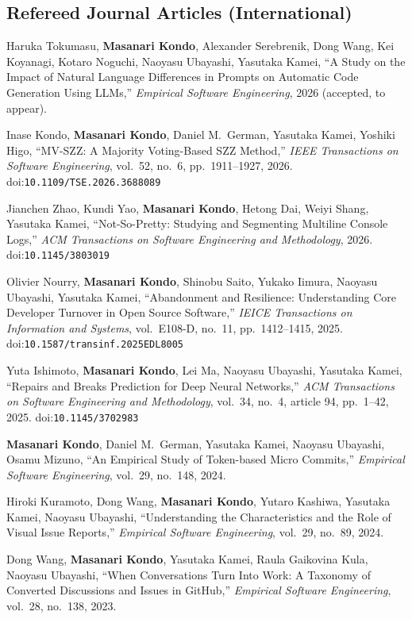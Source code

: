 \documentclass[10pt,a4paper]{article}
\newcommand{\me}{\textbf{Masanari Kondo}}
\begin{document}
\subsection{Refereed Journal Articles (International)}
\begin{publist}[label={[J\arabic*]}]
  \item Haruka Tokumasu, \me, Alexander Serebrenik, Dong Wang, Kei Koyanagi, Kotaro Noguchi, Naoyasu Ubayashi, Yasutaka Kamei, ``A Study on the Impact of Natural Language Differences in Prompts on Automatic Code Generation Using LLMs,'' \textit{Empirical Software Engineering}, 2026 (accepted, to appear).
  \item Inase Kondo, \me, Daniel M.\ German, Yasutaka Kamei, Yoshiki Higo, ``MV-SZZ: A Majority Voting-Based SZZ Method,'' \textit{IEEE Transactions on Software Engineering}, vol.\ 52, no.\ 6, pp.\ 1911--1927, 2026. doi:\nolinkurl{10.1109/TSE.2026.3688089}
  \item Jianchen Zhao, Kundi Yao, \me, Hetong Dai, Weiyi Shang, Yasutaka Kamei, ``Not-So-Pretty: Studying and Segmenting Multiline Console Logs,'' \textit{ACM Transactions on Software Engineering and Methodology}, 2026. doi:\nolinkurl{10.1145/3803019}
  \item Olivier Nourry, \me, Shinobu Saito, Yukako Iimura, Naoyasu Ubayashi, Yasutaka Kamei, ``Abandonment and Resilience: Understanding Core Developer Turnover in Open Source Software,'' \textit{IEICE Transactions on Information and Systems}, vol.\ E108-D, no.\ 11, pp.\ 1412--1415, 2025. doi:\nolinkurl{10.1587/transinf.2025EDL8005}
  \item Yuta Ishimoto, \me, Lei Ma, Naoyasu Ubayashi, Yasutaka Kamei, ``Repairs and Breaks Prediction for Deep Neural Networks,'' \textit{ACM Transactions on Software Engineering and Methodology}, vol.\ 34, no.\ 4, article 94, pp.\ 1--42, 2025. doi:\nolinkurl{10.1145/3702983}
  \item \me, Daniel M.\ German, Yasutaka Kamei, Naoyasu Ubayashi, Osamu Mizuno, ``An Empirical Study of Token-based Micro Commits,'' \textit{Empirical Software Engineering}, vol.\ 29, no.\ 148, 2024.
  \item Hiroki Kuramoto, Dong Wang, \me, Yutaro Kashiwa, Yasutaka Kamei, Naoyasu Ubayashi, ``Understanding the Characteristics and the Role of Visual Issue Reports,'' \textit{Empirical Software Engineering}, vol.\ 29, no.\ 89, 2024.
  \item Dong Wang, \me, Yasutaka Kamei, Raula Gaikovina Kula, Naoyasu Ubayashi, ``When Conversations Turn Into Work: A Taxonomy of Converted Discussions and Issues in GitHub,'' \textit{Empirical Software Engineering}, vol.\ 28, no.\ 138, 2023.

\end{publist}
\end{document}
